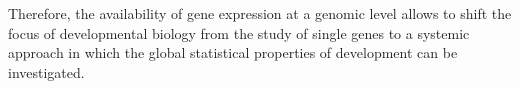 Therefore, the availability of gene expression at a genomic level allows to shift the focus of developmental biology from the study of single genes to a systemic approach in which the global statistical properties of development can be investigated.


%
%

